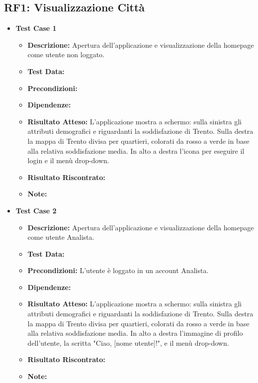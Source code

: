     \subsection{RF1: Visualizzazione Città}
        \begin{itemize}
            \item \textbf{Test Case 1}
                \begin{itemize}
                    \item \textbf{Descrizione:} Apertura dell'applicazione e visualizzazione della homepage come utente non loggato.
                    \item \textbf{Test Data:}
                    \item \textbf{Precondizioni:} 
                    \item \textbf{Dipendenze:}
                    \item \textbf{Risultato Atteso:} L'applicazione mostra a schermo: sulla sinistra gli attributi demografici e riguardanti la soddisfazione di Trento. Sulla destra la mappa di Trento divisa per quartieri, colorati da rosso a verde in base alla relativa soddisfazione media. In alto a destra l'icona per eseguire il login e il menù drop-down.
                    \item \textbf{Risultato Riscontrato:}
                    \item \textbf{Note:}
                \end{itemize}
            \item \textbf{Test Case 2}
                \begin{itemize}
                    \item \textbf{Descrizione:} Apertura dell'applicazione e visualizzazione della homepage come utente Analista.
                    \item \textbf{Test Data:}
                    \item \textbf{Precondizioni:} L'utente è loggato in un account Analista.
                    \item \textbf{Dipendenze:}
                    \item \textbf{Risultato Atteso:} L'applicazione mostra a schermo:  sulla sinistra gli attributi demografici e riguardanti la soddisfazione di Trento. Sulla destra la mappa di Trento divisa per quartieri, colorati da rosso a verde in base alla relativa soddisfazione media. In alto a destra l'immagine di profilo dell'utente, la scritta "Ciao, [nome utente]!", e il menù drop-down.
                    \item \textbf{Risultato Riscontrato:}
                    \item \textbf{Note:}
                \end{itemize}
        \end{itemize}


